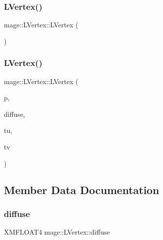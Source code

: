 \subsubsection{\texorpdfstring{L\+Vertex()}{LVertex()}\hspace{0.1cm}{\footnotesize\ttfamily [1/2]}}
{\footnotesize\ttfamily mage\+::\+L\+Vertex\+::\+L\+Vertex (\begin{DoxyParamCaption}{ }\end{DoxyParamCaption})}

\hypertarget{structmage_1_1_l_vertex_a262af68c7c50c1003bcbd941b504fe70}{}\label{structmage_1_1_l_vertex_a262af68c7c50c1003bcbd941b504fe70} 
\subsubsection{\texorpdfstring{L\+Vertex()}{LVertex()}\hspace{0.1cm}{\footnotesize\ttfamily [2/2]}}
{\footnotesize\ttfamily mage\+::\+L\+Vertex\+::\+L\+Vertex (\begin{DoxyParamCaption}\item[{X\+M\+F\+L\+O\+A\+T3}]{p,  }\item[{X\+M\+F\+L\+O\+A\+T4}]{diffuse,  }\item[{float}]{tu,  }\item[{float}]{tv }\end{DoxyParamCaption})}



\subsection{Member Data Documentation}
\hypertarget{structmage_1_1_l_vertex_abfe65c089e650ad20ed41de8e2b585dd}{}\label{structmage_1_1_l_vertex_abfe65c089e650ad20ed41de8e2b585dd} 
\subsubsection{\texorpdfstring{diffuse}{diffuse}}
{\footnotesize\ttfamily X\+M\+F\+L\+O\+A\+T4 mage\+::\+L\+Vertex\+::diffuse}

\hypertarget{structmage_1_1_l_vertex_afdf01d172b1992d4e4f37b9ad9fb2d27}{}\label{structmage_1_1_l_vertex_afdf01d172b1992d4e4f37b9ad9fb2d27} 
